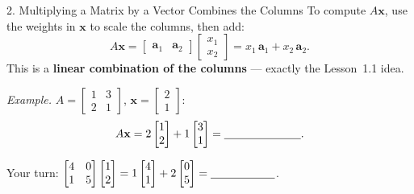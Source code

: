 \documentclass[10pt]{article}
\newcommand{\xx}{\mathbf{x}}
\begin{document}
\begin{notesbox}{2. Multiplying a Matrix by a Vector Combines the Columns}
To compute $A\xx$, use the weights in $\xx$ to scale the columns, then add:
\[
  A\xx = \begin{bmatrix} \mathbf{a}_1 & \mathbf{a}_2 \end{bmatrix}
  \begin{bmatrix} x_1 \\ x_2 \end{bmatrix}
  = x_1\,\mathbf{a}_1 + x_2\,\mathbf{a}_2 .
\]
This is a \textbf{linear combination of the columns} --- exactly the Lesson~1.1 idea.

\vspace{2pt}
\textit{Example.} $A=\begin{bmatrix} 1 & 3 \\ 2 & 1 \end{bmatrix}$, $\xx=\begin{bmatrix} 2 \\ 1 \end{bmatrix}$:
\[
  A\xx = 2\begin{bmatrix} 1 \\ 2 \end{bmatrix} + 1\begin{bmatrix} 3 \\ 1 \end{bmatrix}
  = \blank{2.4cm}.
\]

\vspace{2pt}
Your turn: $\begin{bmatrix} 4 & 0 \\ 1 & 5 \end{bmatrix}\begin{bmatrix} 1 \\ 2 \end{bmatrix}
= 1\begin{bmatrix} 4 \\ 1 \end{bmatrix} + 2\begin{bmatrix} 0 \\ 5 \end{bmatrix} = \blank{2.0cm}$.
\end{notesbox}
\end{document}
